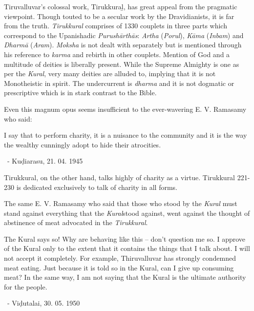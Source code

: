 Tiruvalluvar’s colossal work, Tirukkuraḻ, has great appeal from the pragmatic viewpoint. Though touted to be a secular work by the Dravidianists, it is far from the truth. \textit{Tirukkural} comprises of 1330 couplets in three parts which correspond to the Upanishadic \textit{Purushārthās}: \textit{Artha} (\textit{Porul}), \textit{Kāma} (\textit{Inbam}) and \textit{Dharmā} (\textit{Aram}). \textit{Moksha} is not dealt with separately but is mentioned through his reference to \textit{karma} and rebirth in other couplets. Mention of God and a multitude of deities is liberally present. While the Supreme Almighty is one as per the \textit{Kural}, very many deities are alluded to, implying that it is not Monotheistic in spirit. The undercurrent is \textit{dharma} and it is not dogmatic or prescriptive which is in stark contrast to the Bible.

Even this magnum opus seems insufficient to the ever-wavering E. V. Ramasamy who said:

\begin{myquote}
I say that to perform charity, it is a nuisance to the community and it is the way the wealthy cunningly adopt to hide their atrocities.

~\hfill - Kuḍiarasu, 21. 04. 1945
\end{myquote}

Tirukkural, on the other hand, talks highly of charity as a virtue. Tirukkural 221-230 is dedicated exclusively to talk of charity in all forms.

The same E. V. Ramasamy who said that those who stood by the \textit{Kural} must stand against everything that the \textit{Kural}stood against, went against the thought of abstinence of meat advocated in the \textit{Tirukkural}.

\begin{myquote}
The Kural says so! Why are behaving like this – don’t question me so. I approve of the Kural only to the extent that it contains the things that I talk about. I will not accept it completely. For example, Thiruvalluvar has strongly condemned meat eating. Just because it is told so in the Kural, can I give up consuming meat? In the same way, I am not saying that the Kural is the ultimate authority for the people.

~\hfill - Viḍutalai, 30. 05. 1950
\end{myquote}

